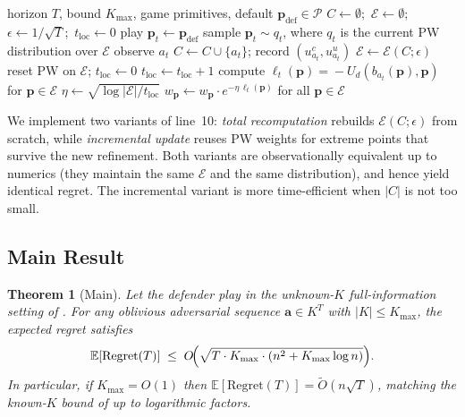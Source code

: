 \documentclass[letterpaper,9pt,twocolumn]{extarticle}
\newcommand{\pvec}{\mathbf{p}}
\newcommand{\avec}{\mathbf{a}}
\newcommand{\cP}{\mathcal{P}}
\newcommand{\cE}{\mathcal{E}}
\newcommand{\EE}{\mathbb{E}}
\newcommand{\Kmax}{K_{\max}}
\newcommand{\Regret}{\mathrm{Regret}}
\theoremstyle{plain}
\newtheorem{theorem}{Theorem}
\theoremstyle{definition}
\theoremstyle{remark}
\begin{document}
\begin{algorithm}[t]
\caption{\textsc{Grow-Catalogue} (full information).}
\label{alg:gc}
\begin{algorithmic}[1]
\small
\Require horizon $T$, bound $\Kmax$, game primitives, default $\pvec_{\text{def}}\in\cP$
\State $C\gets\emptyset$;~$\cE\gets\emptyset$;~$\epsilon\gets 1/\sqrt T$;~$t_{\text{loc}}\gets 0$
  \If{$\cE=\emptyset$} \State play $\pvec_t\gets\pvec_{\text{def}}$
  \Else \State sample $\pvec_t\sim q_t$, where $q_t$ is the current PW distribution over $\cE$
  \EndIf
  \State observe $a_t$
   
    \State $C\gets C\cup\{a_t\}$; record $(u_{a_t}^c,u_{a_t}^u)$
    \State $\cE\gets\cE(C;\epsilon)$ 
    \State reset PW on $\cE$; $t_{\text{loc}}\gets 0$
  \Else {}
    \State $t_{\text{loc}}\gets t_{\text{loc}}+1$
    \State compute $\ell_t(\pvec)\!=\!-U_d(b_{a_t}(\pvec),\pvec)$ for $\pvec\in\cE$
    \State $\eta\gets\sqrt{\log|\cE|/t_{\text{loc}}}$
    \State $w_\pvec\gets w_\pvec\cdot e^{-\eta\,\ell_t(\pvec)}$ for all $\pvec\in\cE$
  \EndIf
\EndFor
\end{algorithmic}
\end{algorithm}

We implement two variants of line~10: \emph{total recomputation} rebuilds
$\cE(C;\epsilon)$ from scratch, while \emph{incremental update} reuses
PW weights for extreme points that survive the new refinement. Both
variants are observationally equivalent up to numerics (they maintain the
same $\cE$ and the same distribution), and hence yield identical regret.
The incremental variant is more time-efficient when $|C|$ is not too small.

\subsection{Main Result}
\label{sec:mainresult}

\begin{theorem}[Main]
\label{thm:main}
Let the defender play  in the unknown-$K$ full-information
setting of . For any oblivious adversarial sequence
$\avec\in K^T$ with $|K|\le\Kmax$, the expected regret satisfies
\begin{equation}
\EE[\Regret(T)]\;\le\;O\!\Bigl(\sqrt{T\cdot\Kmax\cdot(n^2+\Kmax\log n)}\Bigr).
\label{eq:main}
\end{equation}
In particular, if $\Kmax=O(1)$ then $\EE[\Regret(T)]=\tilde O(n\sqrt T)$,
matching the known-$K$ bound of \citet[Theorem 5.1]{balcan2015} up to
logarithmic factors.
\end{theorem}
\end{document}
